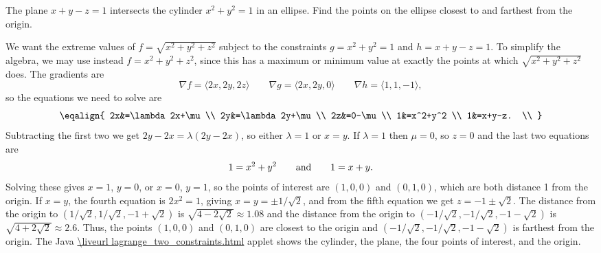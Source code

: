 \begin{example} The plane $x+y-z=1$ intersects the cylinder $x^2+y^2=1$ in an
ellipse. Find the points on the ellipse closest to and farthest from
the origin.

We want the extreme values of $f=\sqrt{x^2+y^2+z^2}$ subject to the
constraints  $g=x^2+y^2=1$ and $h=x+y-z=1$. To simplify the algebra,
we may use instead $f=x^2+y^2+z^2$, since this has a maximum or
minimum value at exactly the points at which $\sqrt{x^2+y^2+z^2}$ does.
The gradients are
$$\nabla f =\langle 2x,2y,2z\rangle\qquad
\nabla g = \langle 2x,2y,0\rangle\qquad
\nabla h = \langle 1,1,-1\rangle,$$
so the equations we need to solve are
$$\eqalign{
2x&=\lambda 2x+\mu \\
2y&=\lambda 2y+\mu \\
2z&=0-\mu \\
1&=x^2+y^2 \\
1&=x+y-z. \\
}$$
Subtracting the first two we get
$2y-2x=\lambda(2y-2x)$, so either $\lambda=1$ or $x=y$. If $\lambda=1$
then $\mu=0$, so $z=0$ and the last two equations are
$$1=x^2+y^2\qquad\hbox{and}\qquad 1=x+y.$$
Solving these gives $x=1$, $y=0$, or $x=0$, $y=1$, so the points of
interest are $(1,0,0)$ and $(0,1,0)$, which are both distance 1 from
the origin. If $x=y$, the fourth equation is $2x^2=1$, giving 
$x=y=\pm1/\sqrt2$, and from the fifth equation we get
$z=-1\pm\sqrt2$. The distance from the origin to 
$(1/\sqrt2,1/\sqrt2,-1+\sqrt2)$ is $\sqrt{4-2\sqrt2}\approx 1.08$ and
the distance from the origin to 
$(-1/\sqrt2,-1/\sqrt2,-1-\sqrt2)$ is $\sqrt{4+2\sqrt2}\approx 2.6$.
Thus, the points $(1,0,0)$ and $(0,1,0)$ are closest to the origin and 
$(-1/\sqrt2,-1/\sqrt2,-1-\sqrt2)$ is farthest from the origin.
The Java 
\expandafter\url\expandafter{\liveurl lagrange_two_constraints.html}%
applet \endurl shows the cylinder, the plane, the four points of
interest, and the origin.
\end{example}

